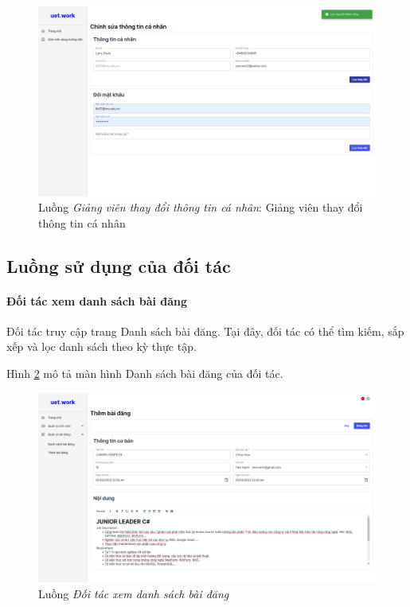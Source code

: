 \documentclass[./../main.tex]{subfiles}
\begin{document}
\begin{figure}[]
	\includegraphics[width=\linewidth]{./images/image52.png}
	\caption{Luồng \emph{Giảng viên thay đổi thông tin cá nhân}: Giảng viên thay đổi thông tin cá nhân}
	\label{fig:lecturer_edit_info}
\end{figure}

\subsection{Luồng sử dụng của đối tác}

\paragraph*{Đối tác xem danh sách bài đăng}

Đối tác truy cập trang Danh sách bài đăng. Tại đây, đối tác có thể tìm kiếm, sắp xếp và lọc danh sách theo kỳ thực tập.

Hình \ref{fig:partner_list_post_page} mô tả màn hình Danh sách bài đăng của đối tác.

\begin{figure}[]
	\includegraphics[width=\linewidth]{./images/image18.png} %
	\caption{Luồng \emph{Đối tác xem danh sách bài đăng}}
	\label{fig:partner_list_post_page}
\end{figure}
\end{document}
